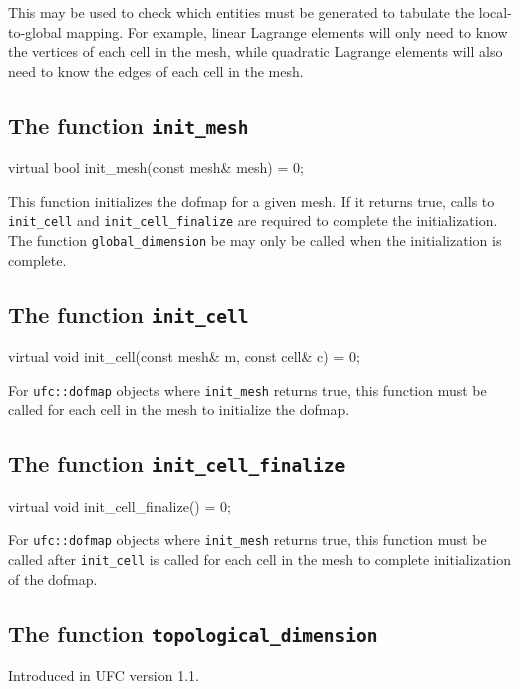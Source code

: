 This may be used to check which entities must be generated to tabulate
the local-to-global mapping. For example, linear Lagrange elements
will only need to know the vertices of each cell in the mesh, while
quadratic Lagrange elements will also need to know the edges of each
cell in the mesh.

\subsection{The function \texttt{init\_mesh}}

\begin{code}
virtual bool init_mesh(const mesh& mesh) = 0;
\end{code}

This function initializes the dofmap for a given mesh. If it returns
true, calls to \texttt{init\_cell} and \texttt{init\_cell\_finalize}
are required to complete the initialization. The function
\texttt{global\_dimension} be may only be called when the
initialization is complete.

\subsection{The function \texttt{init\_cell}}

\begin{code}
virtual void init_cell(const mesh& m,
                       const cell& c) = 0;
\end{code}

For \texttt{ufc::dofmap} objects where \texttt{init\_mesh} returns true,
this function must be called for each cell in the mesh to initialize
the dofmap.

\subsection{The function \texttt{init\_cell\_finalize}}

\begin{code}
virtual void init_cell_finalize() = 0;
\end{code}

For \texttt{ufc::dofmap} objects where \texttt{init\_mesh} returns
true, this function must be called after \texttt{init\_cell} is called
for each cell in the mesh to complete initialization of the dofmap.

\subsection{The function \texttt{topological\_dimension}}
Introduced in UFC version 1.1.


